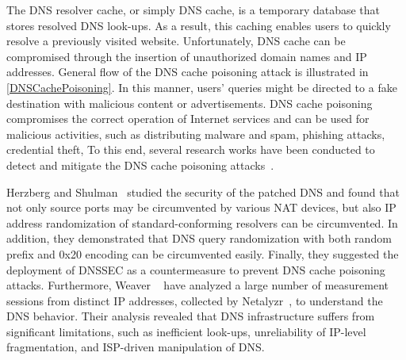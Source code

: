 \label{sec:CachePoisoning}
The DNS resolver cache, or simply DNS cache, is a temporary database that stores resolved DNS look-ups. As a result, this caching enables users to quickly resolve a previously visited website. Unfortunately, DNS cache can be compromised through the insertion of unauthorized domain names and IP addresses. General flow of the DNS cache poisoning attack is illustrated in \autoref{DNSCachePoisoning}. In this manner, users' queries might be directed to a fake destination with malicious content or advertisements. DNS cache poisoning compromises the correct operation of Internet services and can be used for malicious activities, such as distributing malware and spam, phishing attacks, credential theft, \etc To this end, several research works have been conducted to detect and mitigate the DNS cache poisoning attacks~. 
\begin{table}[t]
\begin{center}
\small
\caption{Summary of the some of representative research works that have investigated DNS cache poisoning attacks. Here LDR is Low Deployment Rate of DNSSEC, AR is Acuracy Rate, and WSR donates }
\label{tab:SumCachePoisoning}
\end{center}
\end{table}
Herzberg and Shulman~ studied the security of the patched DNS and found that not only source ports may be circumvented by various NAT devices, but also IP address randomization of standard-conforming resolvers can be circumvented. In addition, they demonstrated that DNS query randomization with both random prefix and 0x20 encoding can be circumvented easily. Finally, they suggested the deployment of DNSSEC as a countermeasure to prevent DNS cache poisoning attacks. Furthermore, Weaver \etal~ have analyzed a large number of measurement sessions from distinct IP addresses, collected by Netalyzr~, to understand the DNS behavior. Their analysis revealed that DNS infrastructure suffers from significant limitations, such as inefficient look-ups, unreliability of IP-level fragmentation, and ISP-driven manipulation of DNS.
